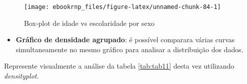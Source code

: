 \documentclass[11pt,]{style/krantz}
\makeatletter
\newenvironment{Shaded}{\begin{snugshade}}{\end{snugshade}}
\newcommand{\DataTypeTok}[1]{\textcolor[rgb]{0.13,0.29,0.53}{#1}}
\newcommand{\KeywordTok}[1]{\textcolor[rgb]{0.13,0.29,0.53}{\textbf{#1}}}
\newcommand{\NormalTok}[1]{#1}
\newcommand{\OperatorTok}[1]{\textcolor[rgb]{0.81,0.36,0.00}{\textbf{#1}}}
\newcommand{\OtherTok}[1]{\textcolor[rgb]{0.56,0.35,0.01}{#1}}
\newcommand{\StringTok}[1]{\textcolor[rgb]{0.31,0.60,0.02}{#1}}
\providecommand{\tightlist}{%
  \setlength{\itemsep}{0pt}\setlength{\parskip}{0pt}}
\newenvironment{kframe}{%
\medskip{}
\setlength{\fboxsep}{.8em}
 \def\at@end@of@kframe{}%
 \ifinner\ifhmode%
  \def\at@end@of@kframe{\end{minipage}}%
  \begin{minipage}{\columnwidth}%
 \fi\fi%
 \def\FrameCommand##1{\hskip\@totalleftmargin \hskip-\fboxsep
 \colorbox{shadecolor}{##1}\hskip-\fboxsep
     \hskip-\linewidth \hskip-\@totalleftmargin \hskip\columnwidth}%
 \MakeFramed {\advance\hsize-\width
   \@totalleftmargin\z@ \linewidth\hsize
   \@setminipage}}%
 {\par\unskip\endMakeFramed%
 \at@end@of@kframe}
\renewenvironment{Shaded}{\begin{kframe}}{\end{kframe}}
\theoremstyle{definition}
\theoremstyle{definition}
\theoremstyle{definition}
\theoremstyle{remark}
\let\BeginKnitrBlock\begin \let\EndKnitrBlock\end
\makeatother
\begin{document}
\begin{Shaded}
\end{Shaded}

\begin{figure}[H]

{\centering \texttt{[image: ebookrnp\_files/figure-latex/unnamed-chunk-84-1]} 

}

\caption{Box-plot de idade vs escolaridade por sexo}\label{fig:unnamed-chunk-84}
\end{figure}

\begin{itemize}
\tightlist
\item
  \textbf{Gráfico de densidade agrupado}: é possível comparara várias curvas simultaneamente no mesmo gráfico para analisar a distribuição dos dados.
\end{itemize}

\BeginKnitrBlock{example}
\protect\hypertarget{exm:unnamed-chunk-85}{}{\label{exm:unnamed-chunk-85} }Represente visualmente a análise da tabela \ref{tab:tab11} desta vez utilizando \emph{densityplot}.
\EndKnitrBlock{example}
\end{document}
